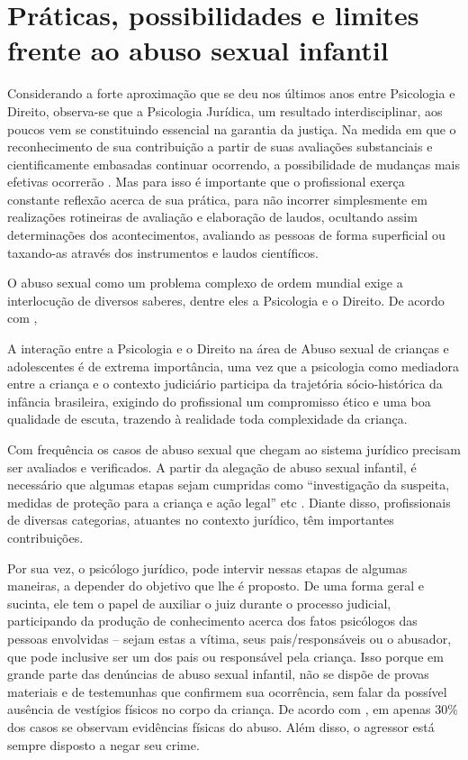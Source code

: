 \section{Práticas, possibilidades e limites frente ao abuso sexual infantil}

Considerando a forte aproximação que se deu nos últimos anos entre Psicologia e Direito, observa-se que a Psicologia Jurídica, um resultado interdisciplinar, aos poucos vem se constituindo essencial na garantia da justiça. Na medida em que o reconhecimento de sua contribuição a partir de suas avaliações substanciais e cientificamente embasadas continuar ocorrendo, a possibilidade de mudanças mais efetivas ocorrerão . Mas para isso é importante que o profissional exerça constante reflexão acerca de sua prática, para não incorrer simplesmente em realizações rotineiras de avaliação e elaboração de laudos, ocultando assim determinações dos acontecimentos, avaliando as pessoas de forma superficial ou taxando-as através dos instrumentos e laudos científicos.

O abuso sexual como um problema complexo de ordem mundial exige a interlocução de diversos saberes, dentre eles a Psicologia e o Direito. De acordo com , 

\begin{citacao}
	A interação entre a Psicologia e o Direito na área de Abuso sexual de crianças e adolescentes é de extrema importância, uma vez que a psicologia como mediadora entre a criança e o contexto judiciário participa da trajetória sócio-histórica da infância brasileira, exigindo do profissional um compromisso ético e uma boa qualidade de escuta, trazendo à realidade toda complexidade da criança.
\end{citacao}

Com frequência os casos de abuso sexual que chegam ao sistema jurídico precisam ser avaliados e verificados. A partir da alegação de abuso sexual infantil, é necessário que algumas etapas sejam cumpridas como ``investigação da suspeita, medidas de proteção para a criança e ação legal'' etc . Diante disso, profissionais de diversas categorias, atuantes no contexto jurídico, têm importantes contribuições. 

Por sua vez, o psicólogo jurídico, pode intervir nessas etapas de algumas maneiras, a depender do objetivo que lhe é proposto. De uma forma geral e sucinta, ele tem o papel de auxiliar o juiz durante o processo judicial, participando da produção de conhecimento acerca dos fatos psicólogos das pessoas envolvidas -- sejam estas a vítima, seus pais/responsáveis ou o abusador, que pode inclusive ser um dos pais ou responsável pela criança. Isso porque em grande parte das denúncias de abuso sexual infantil, não se dispõe de provas materiais e de testemunhas que confirmem  sua ocorrência, sem falar da possível ausência de vestígios físicos no corpo da criança. De acordo com , em apenas 30\% dos casos se observam evidências físicas do abuso. Além disso, o agressor está sempre disposto a negar seu crime. 

